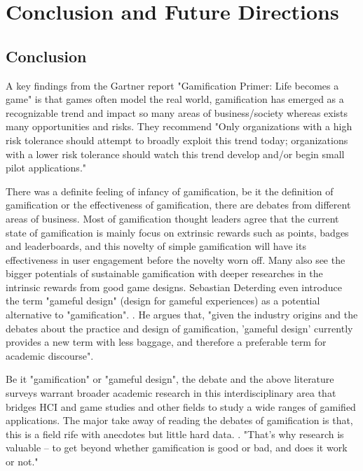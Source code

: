 \chapter{Conclusion and Future Directions}

\section {Conclusion}

A key findings from the Gartner report "Gamification Primer: Life becomes a game" \cite {gartner2010} is that games often model the real world, gamification has emerged as a recognizable trend and impact so many areas of business/society whereas exists many opportunities and risks. They recommend "Only organizations with a high risk tolerance should attempt to broadly exploit this trend today; organizations with a lower risk tolerance should watch this trend develop and/or begin small pilot applications."

There was a definite feeling of infancy of gamification, be it the definition of gamification or the effectiveness of gamification, there are debates from different areas of business.  Most of gamification thought leaders agree that the current state of gamification is mainly focus on extrinsic rewards such as points, badges and leaderboards,  and this novelty of simple gamification will have its effectiveness in user engagement before the novelty worn off. Many also see the bigger potentials of sustainable gamification with deeper researches in the intrinsic rewards from good game designs. Sebastian Deterding even introduce the term "gameful design" (design  for  gameful  experiences)  as  a  potential  alternative  to  "gamification". \cite {Deterding2011mt}. He argues that,  "given the industry origins and the debates about the practice and design of gamification, 'gameful design' currently provides a new term with less baggage, and therefore a preferable term for academic discourse".

Be it "gamification" or "gameful design", the debate and the above literature surveys warrant broader academic research in this interdisciplinary area that bridges HCI and game studies and other fields to study a wide ranges of gamified applications. The major take away of reading the debates of gamification is that, this is a field rife with anecdotes but little hard data. \cite {Wharton2011}.  "That's why research is valuable -- to get beyond whether gamification is good or bad, and does it work or not." 


